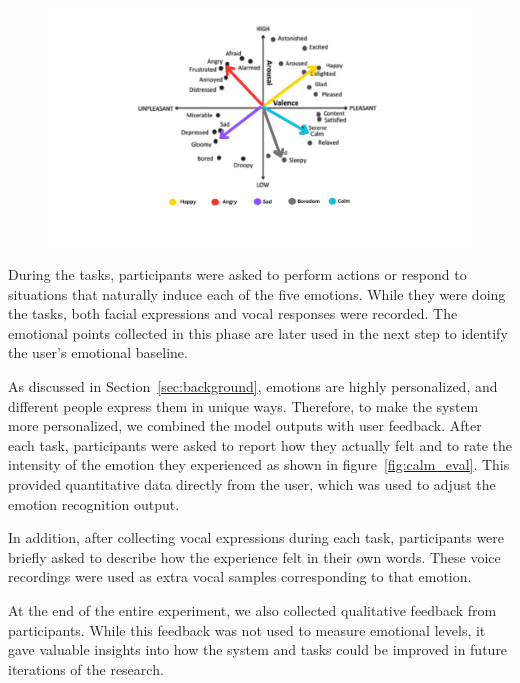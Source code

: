 \begin{figure}[h]
    \centering
    \includegraphics[width=1\textwidth]{img/chapter_03/elicting-tasks-av.png}
    \label{fig:av_isolation}
\end{figure}

During the tasks, participants were asked to perform actions or respond to situations that naturally induce each of the five emotions. While they were doing the tasks, both facial expressions and vocal responses were recorded. The emotional points collected in this phase are later used in the next step to identify the user's emotional baseline.

As discussed in Section~\ref{sec:background}, emotions are highly personalized, and different people express them in unique ways. Therefore, to make the system more personalized, we combined the model outputs with user feedback. After each task, participants were asked to report how they actually felt and to rate the intensity of the emotion they experienced as shown in figure~\ref{fig:calm_eval}. This provided quantitative data directly from the user, which was used to adjust the emotion recognition output.

In addition, after collecting vocal expressions during each task, participants were briefly asked to describe how the experience felt in their own words. These voice recordings were used as extra vocal samples corresponding to that emotion.

At the end of the entire experiment, we also collected qualitative feedback from participants. While this feedback was not used to measure emotional levels, it gave valuable insights into how the system and tasks could be improved in future iterations of the research.


